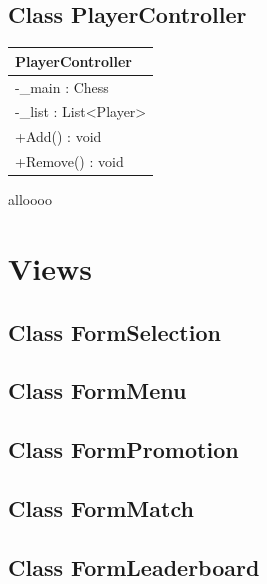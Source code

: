 \documentclass[12pt]{article}
\begin{document}
\subsection{Class PlayerController}

\begin{table}[H]
    \begin{tabular}{|l|}
    \hline
    \rowcolor[HTML]{C0C0C0} 
    \textbf{PlayerController}                       \\ \hline
    \rowcolor[HTML]{EFEFEF} 
    -\_main : Chess                               \\ \hline
    \rowcolor[HTML]{EFEFEF} 
    -\_list : List\textless{}Player\textgreater{} \\ \hline
    \rowcolor[HTML]{FFFFFF} 
    +Add() : void                                 \\ \hline
    \rowcolor[HTML]{FFFFFF} 
    +Remove() : void                              \\ \hline
    \end{tabular}
    \end{table}

\newpage
alloooo

\section{Views}


\subsection{Class FormSelection}
\newpage


\subsection{Class FormMenu}
\newpage


\subsection{Class FormPromotion}
\newpage


\subsection{Class FormMatch}
\newpage


\subsection{Class FormLeaderboard}
\newpage
\end{document}
